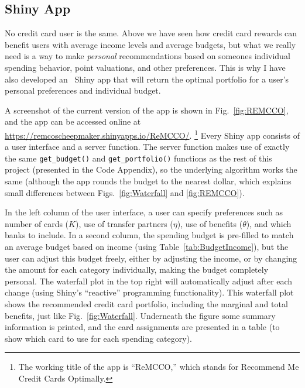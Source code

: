 \clearpage
\subsection{Shiny App} \label{subsec:ShinyApp}

No credit card user is the same. 
Above we have seen how credit card rewards can benefit users with average income levels and average budgets, but what we really need is a way to make \emph{personal} recommendations based on someones individual spending behavior, point valuations, and other preferences. 
This is why I have also developed an \sR\ \textsf{Shiny} app that will return the optimal portfolio for a user's personal preferences and individual budget.

A screenshot of the current version of the app is shown in Fig.~\ref{fig:REMCCO}, and the app can be accessed online at \url{https://remcoscheepmaker.shinyapps.io/ReMCCO/}.%
\footnote{The working title of the app is ``ReMCCO,'' which stands for Recommend Me Credit Cards Optimally.}
Every \textsf{Shiny} app consists of a user interface and a server function. 
The server function makes use of exactly the same \texttt{get\_budget()} and \texttt{get\_portfolio()} functions as the rest of this project (presented in the Code Appendix), so the underlying algorithm works the same (although the app rounds the budget to the nearest dollar, which explains small differences between Figs.~\ref{fig:Waterfall} and \ref{fig:REMCCO}).

In the left column of the user interface, a user can specify preferences such as number of cards ($K$), use of transfer partners ($\eta$), use of benefits ($\theta$), and which banks to include. 
In a second column, the spending budget is pre-filled to match an average budget based on income (using Table~\ref{tab:BudgetIncome}), but the user can adjust this budget freely, either by adjusting the income, or by changing the amount for each category individually, making the budget completely personal. 
The waterfall plot in the top right will automatically adjust after each change (using \textsf{Shiny's} ``reactive'' programming functionality). 
This waterfall plot shows the recommended credit card portfolio, including the marginal and total benefits, just like Fig.~\ref{fig:Waterfall}. 
Underneath the figure some summary information is printed, and the card assignments are presented in a table (to show which card to use for each spending category).

